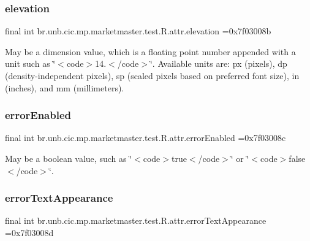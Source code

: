 \subsubsection{\texorpdfstring{elevation}{elevation}}
{\footnotesize\ttfamily final int br.\+unb.\+cic.\+mp.\+marketmaster.\+test.\+R.\+attr.\+elevation =0x7f03008b\hspace{0.3cm}{\ttfamily [static]}}

May be a dimension value, which is a floating point number appended with a unit such as \char`\"{}$<$code$>$14.\+5sp$<$/code$>$\char`\"{}. Available units are\+: px (pixels), dp (density-\/independent pixels), sp (scaled pixels based on preferred font size), in (inches), and mm (millimeters). \mbox{\label{classbr_1_1unb_1_1cic_1_1mp_1_1marketmaster_1_1test_1_1R_1_1attr_a0475c50936668c9c85eb4efce8f1191f}} 
\subsubsection{\texorpdfstring{error\+Enabled}{errorEnabled}}
{\footnotesize\ttfamily final int br.\+unb.\+cic.\+mp.\+marketmaster.\+test.\+R.\+attr.\+error\+Enabled =0x7f03008c\hspace{0.3cm}{\ttfamily [static]}}

May be a boolean value, such as \char`\"{}$<$code$>$true$<$/code$>$\char`\"{} or \char`\"{}$<$code$>$false$<$/code$>$\char`\"{}. \mbox{\label{classbr_1_1unb_1_1cic_1_1mp_1_1marketmaster_1_1test_1_1R_1_1attr_af5f0544ec6798e2f1dc8e0caae4b5db6}} 
\subsubsection{\texorpdfstring{error\+Text\+Appearance}{errorTextAppearance}}
{\footnotesize\ttfamily final int br.\+unb.\+cic.\+mp.\+marketmaster.\+test.\+R.\+attr.\+error\+Text\+Appearance =0x7f03008d\hspace{0.3cm}{\ttfamily [static]}}

